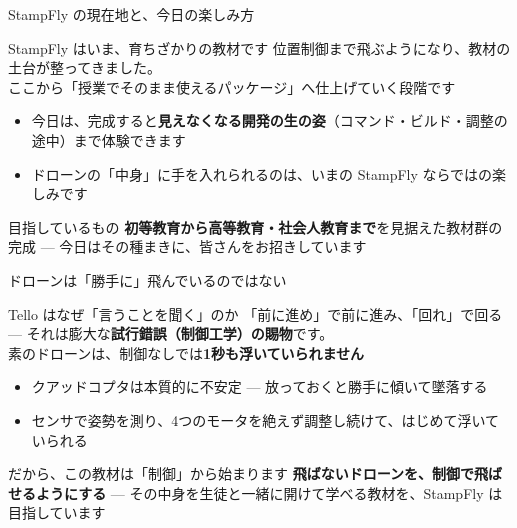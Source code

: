 \begin{frame}{StampFly の現在地と、今日の楽しみ方}
  \begin{block}{StampFly はいま、育ちざかりの教材です}
    \small 位置制御まで飛ぶようになり、教材の土台が整ってきました。\\
    ここから「授業でそのまま使えるパッケージ」へ仕上げていく段階です
  \end{block}

  \vspace{0.2em}

  \begin{itemize}\small
    \item 今日は、完成すると\textbf{見えなくなる開発の生の姿}（コマンド・ビルド・調整の途中）まで体験できます
    \item ドローンの「中身」に手を入れられるのは、いまの StampFly ならではの楽しみです
  \end{itemize}

  \vspace{0.2em}

  \begin{exampleblock}{目指しているもの}
    \small \textbf{初等教育から高等教育・社会人教育まで}を見据えた教材群の完成 --- 今日はその種まきに、皆さんをお招きしています
  \end{exampleblock}
\end{frame}

\begin{frame}{ドローンは「勝手に」飛んでいるのではない}
  \begin{block}{Tello はなぜ「言うことを聞く」のか}
    \small 「前に進め」で前に進み、「回れ」で回る --- それは膨大な\textbf{試行錯誤（制御工学）の賜物}です。\\
    素のドローンは、制御なしでは\textbf{1秒も浮いていられません}
  \end{block}

  \vspace{0.3em}

  \begin{itemize}\small
    \item クアッドコプタは本質的に不安定 --- 放っておくと勝手に傾いて墜落する
    \item センサで姿勢を測り、4つのモータを絶えず調整し続けて、はじめて浮いていられる
  \end{itemize}

  \vspace{0.3em}

  \begin{exampleblock}{だから、この教材は「制御」から始まります}
    \small \textbf{飛ばないドローンを、制御で飛ばせるようにする} --- その中身を生徒と一緒に開けて学べる教材を、StampFly は目指しています
  \end{exampleblock}
\end{frame}

